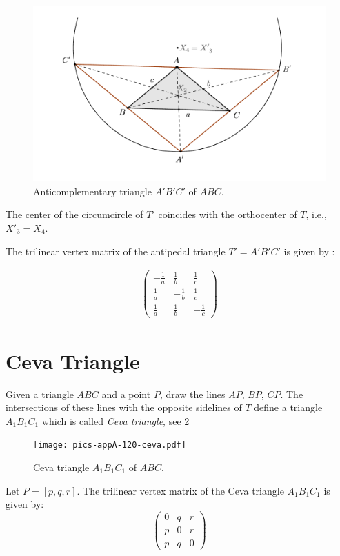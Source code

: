   \begin{figure}[H]
     \centering
      \includegraphics[scale=0.6]{zappA/pics/pics_appA_0100_anticimplementary.pdf}
    \caption{Anticomplementary triangle $A'B'C'$ of $ABC$.}
    \label{fig:pedal-triangle}
\end{figure}
The center of the circumcircle of $T'$ coincides with the orthocenter of $T$, i.e., $X'_3=X_4$.

The trilinear vertex matrix of the antipedal triangle $T'=A'B'C'$ is given by \cite{mw}:
 
\begin{align*}
   \left(\begin{matrix}-\frac{1}{a} &\frac{1}{b} &\frac{1}{c}\\
    \frac{1}{a} &-\frac{1}{b} &\frac{1}{c}\\
    \frac{1}{a} &\frac{1}{b} &-\frac{1}{c}\end{matrix}\right)
    \end{align*}
   
   \section{Ceva Triangle}
   
   Given a triangle $ABC$ and a point $P$, draw the lines $AP$, $BP$, $CP$. The intersections of these lines with the opposite sidelines of $T$ define a triangle $A_1B_1C_1$ which is called {\em Ceva triangle}, see \cref{fig:appA-ceva-triangle}
   
     \begin{figure}[H]
     \centering
      \texttt{[image: pics-appA-120-ceva.pdf]}
    \caption{Ceva triangle $A_1B_1C_1$ of $ABC$.}
    \label{fig:appA-ceva-triangle}
\end{figure}
Let $P=[p,q,r]$. The trilinear vertex matrix of the Ceva triangle $A_1B_1C_1$ is given by:
\[
\left( \begin{matrix}  0 & q & r \\  p & 0 & r
\\p & q & 0 \end{matrix} \right) \]



